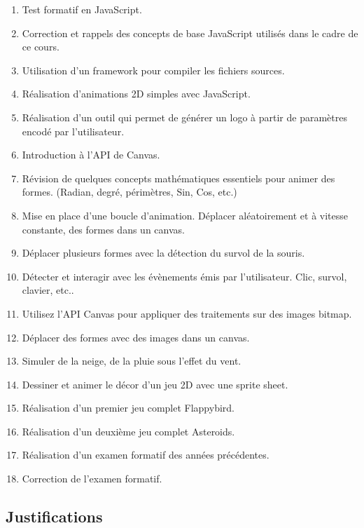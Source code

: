 \begin{enumerate}
    \item Test formatif en JavaScript.
    \item Correction et rappels des concepts de base JavaScript utilisés dans le cadre de ce cours.
    \item Utilisation d’un framework pour compiler les fichiers sources.
    \item Réalisation d'animations 2D simples avec JavaScript.
    \item Réalisation d’un outil qui permet de générer un logo à partir de paramètres encodé par l’utilisateur.
    \item Introduction à l’API de Canvas.
    \item Révision de quelques concepts mathématiques essentiels pour animer des formes. (Radian, degré, périmètres, Sin, Cos, etc.)
    \item Mise en place d’une boucle d’animation. Déplacer aléatoirement et à vitesse constante, des formes dans un canvas.
    \item Déplacer plusieurs formes avec la détection du survol de la souris.
    \item Détecter et interagir avec les évènements émis par l'utilisateur. Clic, survol, clavier, etc..
    \item Utilisez l’API Canvas pour appliquer des traitements sur des images bitmap.
    \item Déplacer des formes avec des images dans un canvas.
    \item Simuler de la neige, de la pluie sous l'effet du vent.
    \item Dessiner et animer le décor d’un jeu 2D avec une sprite sheet.
    \item Réalisation d’un premier jeu complet Flappybird.
    \item Réalisation d’un deuxième jeu complet Asteroids.
    \item Réalisation d’un examen formatif des années précédentes.
    \item Correction de l'examen formatif.
\end{enumerate}

\clearpage
\subsection{Justifications}

